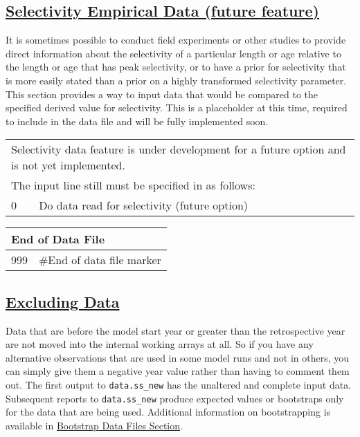\hypertarget{SelexEmperical}{}
\subsection[Selectivity Empirical Data (future feature)]{\protect\hyperlink{SelexEmperical}{Selectivity Empirical Data (future feature)}}
It is sometimes possible to conduct field experiments or other studies to provide direct information about the selectivity of a particular length or age relative to the length or age that has peak selectivity, or to have a prior for selectivity that is more easily stated than a prior on a highly transformed selectivity parameter. This section provides a way to input data that would be compared to the specified derived value for selectivity. This is a placeholder at this time, required to include in the data file and will be fully implemented soon.

\begin{center}
	\begin{tabular}{p{1cm} p{1.5cm} p{1.5cm} p{1.5cm} p{1.5cm} p{1.5cm} p{2.5cm} p{2.5cm} p{2.5cm}}
		\multicolumn{9}{l}{Selectivity data feature is under development for a future option and is not yet implemented.} \\
		\multicolumn{9}{l}{The input line still must be specified in as follows:} \\
		\hline
		0 & \multicolumn{8}{l}{Do data read for selectivity (future option)} \Tstrut\Bstrut\\
        \hline
	\end{tabular}
\end{center}

\begin{center}
	\begin{tabular}{p{2cm} p{14cm}} \\
		\multicolumn{2}{l}{End of Data File} \\
		\hline
		999 & \#End of data file marker \Tstrut\Bstrut\\
		\hline
	\end{tabular}
\end{center}

\hypertarget{ExcludingData}{}
\subsection[Excluding Data]{\protect\hyperlink{ExcludingData}{Excluding Data}}
Data that are before the model start year or greater than the retrospective year are not moved into the internal working arrays at all. So if you have any alternative observations that are used in some model runs and not in others, you can simply give them a negative year value rather than having to comment them out. The first output to \texttt{data.ss\_new} has the unaltered and complete input data. Subsequent reports to \texttt{data.ss\_new} produce expected values or bootstraps only for the data that are being used. Additional information on bootstrapping is available in \hyperlink{bootstrap}{Bootstrap Data Files Section}. 

